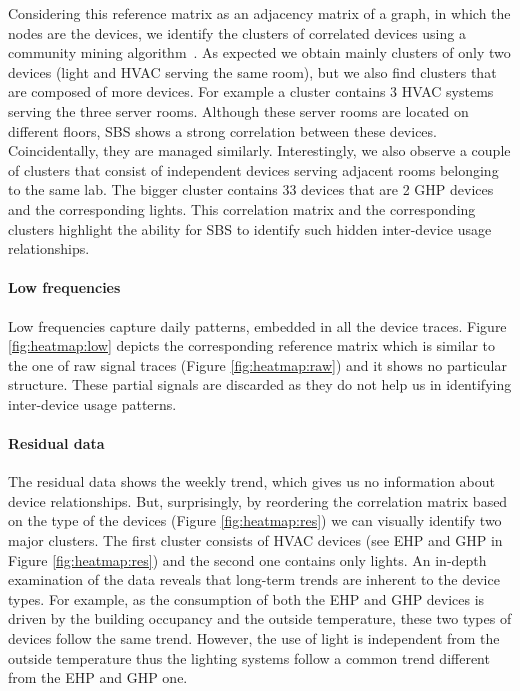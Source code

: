Considering this reference matrix as an adjacency matrix of a graph, in which the nodes are the devices, we identify the clusters of 
correlated devices using a community mining algorithm~\cite{blondel:unfolding}.
As expected we obtain mainly clusters of only two devices (light and HVAC serving the same room), but we also find clusters that are composed of more devices.
For example a cluster contains 3 HVAC systems serving the three server rooms. Although these server rooms are located on
 different floors, SBS shows a strong correlation between these devices.  Coincidentally, they are managed similarly.
Interestingly, we also observe a couple of clusters that consist of independent devices serving adjacent rooms belonging to the same lab.
The bigger cluster contains 33 devices that are 2 GHP devices and the corresponding lights.
This correlation matrix and the corresponding clusters 
highlight the ability for SBS to identify such hidden inter-device usage relationships.
 
\paragraph{Low frequencies}
Low frequencies capture daily patterns, embedded in all the device traces.  
Figure \ref{fig:heatmap:low} depicts the corresponding reference matrix which is similar to the one of raw signal traces (Figure \ref{fig:heatmap:raw}) 
and it shows no particular structure.%
These partial signals are discarded as they do not help us in identifying inter-device usage patterns.
 
\paragraph{Residual data}
The residual data shows the weekly trend, which gives us no information about device relationships.
But, surprisingly, by reordering the correlation matrix based on the type of the devices (Figure \ref{fig:heatmap:res}) 
we can visually identify two major clusters.
The first cluster consists of HVAC devices (see EHP and GHP in Figure \ref{fig:heatmap:res}) and the second one contains only lights. 
An in-depth examination of the data reveals that long-term trends are inherent to the device types. 
For example, as the consumption of both the EHP and GHP devices is driven by the building occupancy and the outside temperature, these two types of devices follow the same trend. 
However, the use of light is independent from the outside temperature thus the lighting systems follow a common trend different from the EHP and GHP one.

